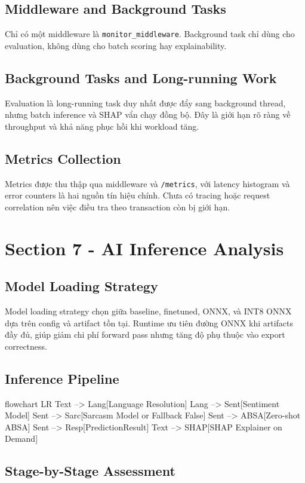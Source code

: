\subsection{Middleware and Background Tasks}
Chỉ có một middleware là \texttt{monitor\_middleware}. Background task chỉ dùng cho evaluation, không dùng cho batch scoring hay explainability.

\subsection{Background Tasks and Long-running Work}
Evaluation là long-running task duy nhất được đẩy sang background thread, nhưng batch inference và SHAP vẩn chạy đồng bộ. Đây là giới hạn rõ ràng về throughput và khả năng phục hồi khi workload tăng.

\subsection{Metrics Collection}
Metrics được thu thập qua middleware và \texttt{/metrics}, với latency histogram và error counters là hai nguồn tín hiệu chính. Chưa có tracing hoặc request correlation nên việc điều tra theo transaction còn bị giới hạn.

\section{Section 7 - AI Inference Analysis}
\subsection{Model Loading Strategy}
Model loading strategy chọn giữa baseline, finetuned, ONNX, và INT8 ONNX dựa trên config và artifact tồn tại. Runtime ưu tiên đường ONNX khi artifacts đầy đủ, giúp giảm chi phí forward pass nhưng tăng độ phụ thuộc vào export correctness.

\subsection{Inference Pipeline}
\begin{mermaidblock}
flowchart LR
  Text --> Lang[Language Resolution]
  Lang --> Sent[Sentiment Model]
  Sent --> Sarc[Sarcasm Model or Fallback False]
  Sent --> ABSA[Zero-shot ABSA]
  Sent --> Resp[PredictionResult]
  Text --> SHAP[SHAP Explainer on Demand]
\end{mermaidblock}

\subsection{Stage-by-Stage Assessment}
